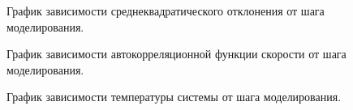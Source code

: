 \documentclass[14pt,a4paper,report]{ncc}
\begin{document}
\begin{figure}[h!]
\caption{График зависимости среднеквадратического отклонения от шага моделирования.}
\label{ris:image13}
\end{figure}
\begin{figure}[h!]
\caption{График зависимости автокорреляционной функции скорости от шага моделирования.}
\label{ris:image14}
\end{figure}
\begin{figure}[h!]
\caption{График зависимости температуры системы от шага моделирования.}
\label{ris:image15}
\end{figure}
\end{document}
